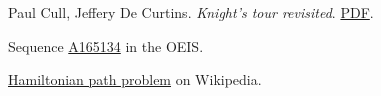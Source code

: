 \documentclass[11pt]{article}
\begin{document}
\begin{thebibliography}{9}

  Paul Cull, Jeffery De Curtins. 
  \emph{Knight's tour revisited}.
   \href{http://www.fq.math.ca/Scanned/16-3/cull.pdf}{PDF}.

  Sequence
  \href{https://oeis.org/A165134}{A165134} in the OEIS.
  
  \href{https://en.wikipedia.org/wiki/Hamiltonian_path_problem}{Hamiltonian path problem} on Wikipedia.

\end{thebibliography}
\end{document}
